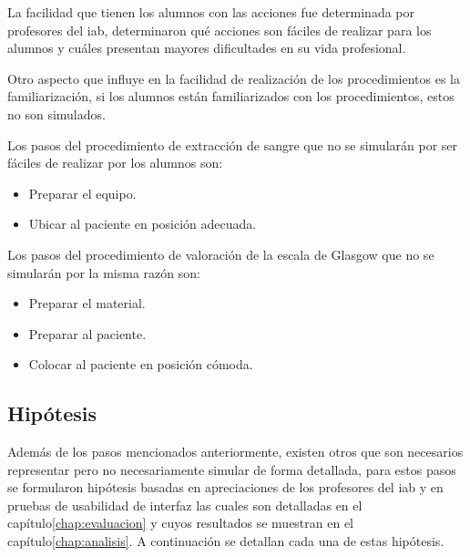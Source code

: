 \begin{itemize}
    La facilidad que tienen los alumnos con las acciones fue determinada por
    profesores del \Gls{iab}, determinaron qué acciones son fáciles de
    realizar para los alumnos y cuáles presentan mayores dificultades en su
    vida profesional.

    Otro aspecto que influye en la facilidad de realización de los
    procedimientos es la familiarización, si los alumnos están
    familiarizados con los procedimientos, estos no son simulados.
        
    Los pasos del procedimiento de extracción de sangre que no se simularán por 
    ser fáciles de realizar por los alumnos son:
        
    \begin{itemize}
        \item Preparar el equipo.
        \item Ubicar al paciente en posición adecuada.
    \end{itemize}
    
    Los pasos del procedimiento de valoración de la escala de Glasgow 
    que no se simularán por la misma razón son:
    \begin{itemize}
    \item Preparar el material.
    \item Preparar al paciente.
    \item Colocar al paciente en posición cómoda.
    \end{itemize}
        
\end{itemize}

\subsection{Hipótesis}

Además de los pasos mencionados anteriormente, existen otros que son necesarios 
representar pero no necesariamente simular de forma detallada, para estos 
pasos se formularon hipótesis basadas en apreciaciones de 
los profesores del \Gls{iab} y en pruebas de usabilidad de interfaz las cuales 
son detalladas en el capítulo\ref{chap:evaluacion} y cuyos resultados se muestran 
en el capítulo\ref{chap:analisis}. A continuación se detallan cada una de estas 
hipótesis.

